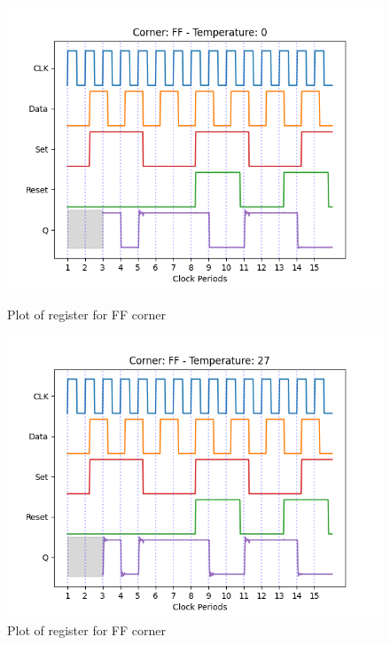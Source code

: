 \begin{figure}[H]
    \begin{minipage}{0.5\textwidth}
        \centering
        \includegraphics[width=\textwidth]{Figures/Aimspice_Plots/FF_0.png}
        \caption{Plot of register for FF corner}
        \label{fig:FF0}
    \end{minipage}%
    \begin{minipage}{0.5\textwidth}
        \centering
        \includegraphics[width=\textwidth]{Figures/Aimspice_Plots/FF_27.png}
        \caption{Plot of register for FF corner}
        \label{fig:FF27}
    \end{minipage}
\end{figure}
